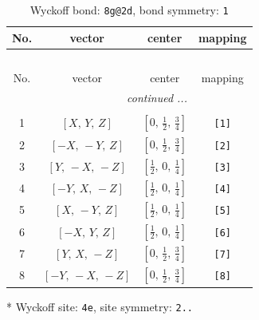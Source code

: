 \documentclass[fleqn,8pt]{jsarticle}
\begin{document}
\begin{longtable}{cccc}
\caption{Wyckoff bond: {\tt 8g@2d}, bond symmetry: {\tt 1}}
 \\
 \hline \hline
No. & vector & center & mapping \\ \hline \endfirsthead

\multicolumn{3}{l}{\tablename\ \thetable{}} \\
 \hline \hline
No. & vector & center & mapping \\ \hline \endhead

 \hline \hline
\multicolumn{3}{r}{\footnotesize\it continued ...} \\ \endfoot

 \hline \hline
\multicolumn{3}{r}{} \\ \endlastfoot

1 & $\left[ X,\, Y,\, Z \right]$ & $\left[ 0,\, \frac{1}{2},\, \frac{3}{4} \right]$ & {\tt [1]} \\ \hline
2 & $\left[ - X,\, - Y,\, Z \right]$ & $\left[ 0,\, \frac{1}{2},\, \frac{3}{4} \right]$ & {\tt [2]} \\ \hline
3 & $\left[ Y,\, - X,\, - Z \right]$ & $\left[ \frac{1}{2},\, 0,\, \frac{1}{4} \right]$ & {\tt [3]} \\ \hline
4 & $\left[ - Y,\, X,\, - Z \right]$ & $\left[ \frac{1}{2},\, 0,\, \frac{1}{4} \right]$ & {\tt [4]} \\ \hline
5 & $\left[ X,\, - Y,\, Z \right]$ & $\left[ \frac{1}{2},\, 0,\, \frac{1}{4} \right]$ & {\tt [5]} \\ \hline
6 & $\left[ - X,\, Y,\, Z \right]$ & $\left[ \frac{1}{2},\, 0,\, \frac{1}{4} \right]$ & {\tt [6]} \\ \hline
7 & $\left[ Y,\, X,\, - Z \right]$ & $\left[ 0,\, \frac{1}{2},\, \frac{3}{4} \right]$ & {\tt [7]} \\ \hline
8 & $\left[ - Y,\, - X,\, - Z \right]$ & $\left[ 0,\, \frac{1}{2},\, \frac{3}{4} \right]$ & {\tt [8]} \\
\end{longtable}
* Wyckoff site: {\tt 4e}, site symmetry: {\tt 2..}
\renewcommand{\arraystretch}{1.2}
\end{document}
